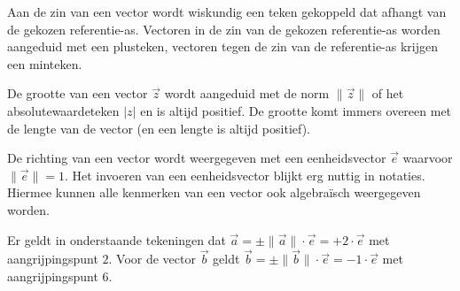 \documentclass{ximera}
\begin{document}
Aan de zin van een vector wordt wiskundig een teken gekoppeld dat afhangt van de gekozen referentie-as. 
Vectoren in de zin van de gekozen referentie-as worden aangeduid met een plusteken, vectoren tegen de zin van de referentie-as krijgen een minteken. 

De grootte van een vector \(\vec{z}\) wordt aangeduid met de norm $ \lVert \vec{z} \rVert $  of het absolutewaardeteken $\lvert z \rvert $ en is altijd positief. 
De grootte komt immers overeen met de lengte van de vector (en een lengte is altijd positief). 







De richting van een vector wordt weergegeven met een eenheidsvector $\vec{e}$ waarvoor $ \lVert \vec{e} \rVert = 1$. 
Het invoeren van een eenheidsvector blijkt erg nuttig in notaties. 
Hiermee kunnen alle kenmerken van een vector ook algebraïsch weergegeven worden. 

Er geldt in onderstaande tekeningen dat \(\vec{a} = \pm  \lVert \vec{a} \rVert \cdot \vec{e} = +2 \cdot \vec{e} \) met aangrijpingspunt \(2\). 
Voor de vector \(\vec{b}\) geldt \(\vec{b} = \pm  \lVert \vec{b} \rVert \cdot \vec{e} = -1 \cdot \vec{e} \) met aangrijpingspunt \(6\). 

\end{document}
